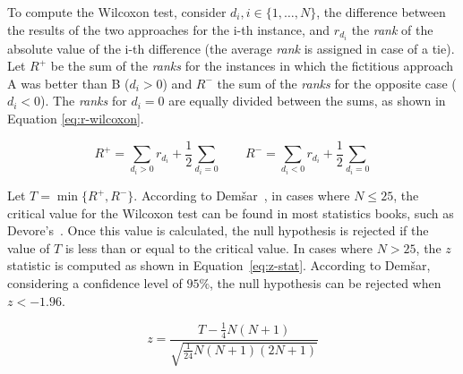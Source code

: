 To compute the Wilcoxon test, consider $d_i, i \in \{1, \dots, N\}$, the difference between the results of the two approaches for the i-th instance, and $r_{d_i}$ the \textit{rank} of the absolute value of the i-th difference (the average \textit{rank} is assigned in case of a tie). Let $R^+$ be the sum of the \textit{ranks} for the instances in which the fictitious approach A was better than B ($d_i > 0$) and $R^{-}$ the sum of the \textit{ranks} for the opposite case ($d_i < 0$). The \textit{ranks} for $d_i = 0$ are equally divided between the sums, as shown in Equation \eqref{eq:r-wilcoxon}.

\begin{equation}
    R^{+} = \sum_{d_i > 0} r_{d_i} + \frac{1}{2}\sum_{d_i = 0} \quad \quad R^{-} = \sum_{d_i < 0} r_{d_i} + \frac{1}{2}\sum_{d_i = 0} \label{eq:r-wilcoxon}
\end{equation}

Let $T = \min\{R^+, R^{-}\}$. According to Dem\v{s}ar~\cite{demsar:2006}, in cases where $N \leq 25$, the critical value for the Wilcoxon test can be found in most statistics books, such as Devore’s~\cite{devore:2011}. Once this value is calculated, the null hypothesis is rejected if the value of $T$ is less than or equal to the critical value. In cases where $N > 25$, the $z$ statistic is computed as shown in Equation~\eqref{eq:z-stat}. According to Dem\v{s}ar, considering a confidence level of $95\%$, the null hypothesis can be rejected when $z < -1.96$.

\begin{equation}
    z = \frac{T - \frac{1}{4} N(N + 1)}{\sqrt{\frac{1}{24} N(N+1)(2N + 1)}} \label{eq:z-stat}
\end{equation}
